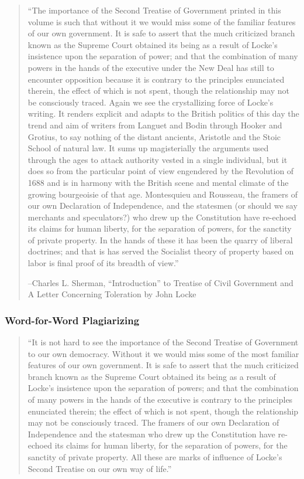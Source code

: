 \begin{quote}“The importance of the Second Treatise of Government printed in this volume is such that without it we would miss some of the familiar features of our own government. It is safe to assert that the much criticized branch known as the Supreme Court obtained its being as a result of Locke’s insistence upon the separation of power; and that the combination of many powers in the hands of the executive under the New Deal has still to encounter opposition because it is contrary to the principles enunciated therein, the effect of which is not spent, though the relationship may not be consciously traced. Again we see the crystallizing force of Locke’s writing. It renders explicit and adapts to the British politics of this day the trend and aim of writers from Languet and Bodin through Hooker and Grotius, to say nothing of the distant ancients, Aristotle and the Stoic School of natural law. It sums up magisterially the arguments used through the ages to attack authority vested in a single individual, but it does so from the particular point of view engendered by the Revolution of 1688 and is in harmony with the British scene and mental climate of the growing bourgeoisie of that age. Montesquieu and Rousseau, the framers of our own Declaration of Independence, and the statesmen (or should we say merchants and speculators?) who drew up the Constitution have re-echoed its claims for human liberty, for the separation of powers, for the sanctity of private property. In the hands of these it has been the quarry of liberal doctrines; and that is has served the Socialist theory of property based on labor is final proof of its breadth of view.”

--Charles L. Sherman, “Introduction” to Treatise of Civil Government and A Letter Concerning Toleration by John Locke

\end{quote}

\subsubsection{Word-for-Word Plagiarizing}

\begin{quote}“It is not hard to see the importance of the Second Treatise of Government to our own democracy. Without it we would miss some of the most familiar features of our own government. It is safe to assert that the much criticized branch known as the Supreme Court obtained its being as a result of Locke’s insistence upon the separation of powers; and that the combination of many powers in the hands of the executive is contrary to the principles enunciated therein; the effect of which is not spent, though the relationship may not be consciously traced. The framers of our own Declaration of Independence and the statesman who drew up the Constitution have re-echoed its claims for human liberty, for the separation of powers, for the sanctity of private property. All these are marks of influence of Locke’s Second Treatise on our own way of life.”
\end{quote}

